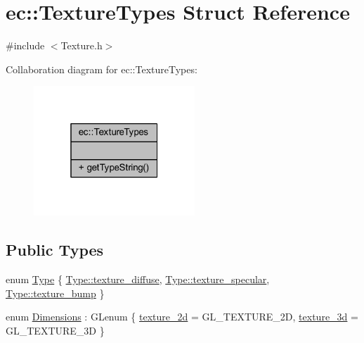 \hypertarget{structec_1_1_texture_types}{}\section{ec\+:\+:Texture\+Types Struct Reference}
\label{structec_1_1_texture_types}


{\ttfamily \#include $<$Texture.\+h$>$}



Collaboration diagram for ec\+:\+:Texture\+Types\+:\nopagebreak
\begin{figure}[H]
\begin{center}
\leavevmode
\includegraphics[width=172pt]{structec_1_1_texture_types__coll__graph}
\end{center}
\end{figure}
\subsection*{Public Types}
\begin{DoxyCompactItemize}
\item 
enum \mbox{\hyperlink{structec_1_1_texture_types_aff67825b98dd1edd7e4783350e866202}{Type}} \{ \mbox{\hyperlink{structec_1_1_texture_types_aff67825b98dd1edd7e4783350e866202a14537624b53e4f7ea1ed6da9d69689bd}{Type\+::texture\+\_\+diffuse}}, 
\mbox{\hyperlink{structec_1_1_texture_types_aff67825b98dd1edd7e4783350e866202a15de69baae1c21be50ddee302cc11949}{Type\+::texture\+\_\+specular}}, 
\mbox{\hyperlink{structec_1_1_texture_types_aff67825b98dd1edd7e4783350e866202a700e2ecc89c80e856d64e370ea3f13af}{Type\+::texture\+\_\+bump}}
 \}
\item 
enum \mbox{\hyperlink{structec_1_1_texture_types_ac0e07f24452fa28dd8e6e33a224842fc}{Dimensions}} \+: G\+Lenum \{ \mbox{\hyperlink{structec_1_1_texture_types_ac0e07f24452fa28dd8e6e33a224842fca13a163219b727876c389ffc248f28e04}{texture\+\_\+2d}} = G\+L\+\_\+\+T\+E\+X\+T\+U\+R\+E\+\_\+2D, 
\mbox{\hyperlink{structec_1_1_texture_types_ac0e07f24452fa28dd8e6e33a224842fcaf7383d5e217f8da43906166138a147ab}{texture\+\_\+3d}} = G\+L\+\_\+\+T\+E\+X\+T\+U\+R\+E\+\_\+3D
 \}
\end{DoxyCompactItemize}
